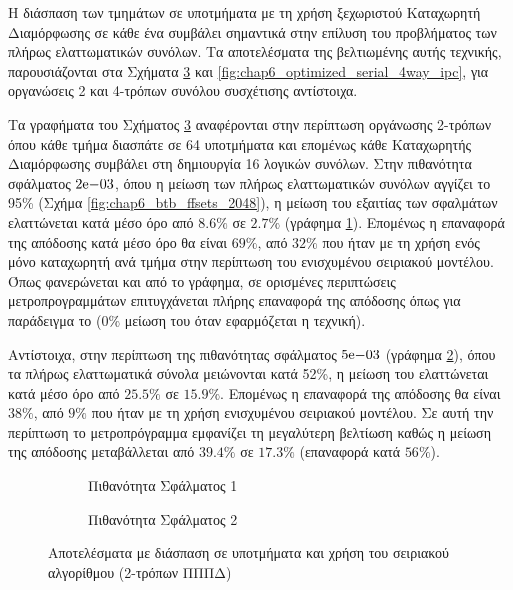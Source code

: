 Η διάσπαση των τμημάτων σε υποτμήματα με τη χρήση ξεχωριστού Καταχωρητή Διαμόρφωσης σε κάθε ένα συμβάλει σημαντικά στην επίλυση του προβλήματος των πλήρως ελαττωματικών συνόλων. Τα αποτελέσματα της βελτιωμένης αυτής τεχνικής, παρουσιάζονται στα Σχήματα \ref{fig:chap6_optimized_serial_2way_ipc} και \ref{fig:chap6_optimized_serial_4way_ipc}, για οργανώσεις 2 και 4-τρόπων συνόλου συσχέτισης αντίστοιχα.
\par
Τα γραφήματα του Σχήματος \ref{fig:chap6_optimized_serial_2way_ipc} αναφέρονται στην περίπτωση οργάνωσης 2-τρόπων όπου κάθε τμήμα διασπάτε σε 64 υποτμήματα και επομένως κάθε Καταχωρητής Διαμόρφωσης συμβάλει στη δημιουργία 16 λογικών συνόλων. Στην πιθανότητα σφάλματος $2\mathrm{e}{-03}$, όπου η μείωση των πλήρως ελαττωματικών συνόλων αγγίζει το 95\% (Σχήμα \ref{fig:chap6_btb_ffsets_2048}), η μείωση του \ipc εξαιτίας των σφαλμάτων ελαττώνεται κατά μέσο όρο από $8.6\%$ σε $2.7\%$ (γράφημα \ref{fig:chap6_optimized_serial_2way_pail1_ipc}). Επομένως η επαναφορά της απόδοσης κατά μέσο όρο θα είναι $69\%$, από $32\%$ που ήταν με τη χρήση ενός μόνο καταχωρητή ανά τμήμα στην περίπτωση του ενισχυμένου σειριακού μοντέλου. Όπως φανερώνεται και από το γράφημα, σε ορισμένες περιπτώσεις μετροπρογραμμάτων επιτυγχάνεται πλήρης επαναφορά της απόδοσης όπως για παράδειγμα το  ($0\%$ μείωση του \ipc όταν εφαρμόζεται η τεχνική).
\par
Αντίστοιχα, στην περίπτωση της πιθανότητας σφάλματος $5\mathrm{e}{-03}$ (γράφημα \ref{fig:chap6_optimized_serial_2way_pail2_ipc}), όπου τα πλήρως ελαττωματικά σύνολα μειώνονται κατά 52\%, η μείωση του \ipc ελαττώνεται κατά μέσο όρο από $25.5\%$ σε $15.9\%$. Επομένως η επαναφορά της απόδοσης θα είναι $38\%$, από $9\%$ που ήταν με τη χρήση ενισχυμένου σειριακού μοντέλου. Σε αυτή την περίπτωση το μετροπρόγραμμα  εμφανίζει τη μεγαλύτερη βελτίωση καθώς η μείωση της απόδοσης μεταβάλλεται από $39.4\%$ σε $17.3\%$ (επαναφορά κατά $56\%$).

\begin{figure}[!t]
    \centering
    \begin{subfigure}[t]{\textwidth}
        \centering
        \caption{Πιθανότητα Σφάλματος 1}
        \label{fig:chap6_optimized_serial_2way_pail1_ipc}
    \end{subfigure}
    
    \begin{subfigure}[t]{\textwidth}
        \centering
        \caption{Πιθανότητα Σφάλματος 2}
        \label{fig:chap6_optimized_serial_2way_pail2_ipc}
    \end{subfigure}
    
    \caption{Αποτελέσματα με διάσπαση σε υποτμήματα και χρήση του σειριακού αλγορίθμου (2-τρόπων ΠΠΠΔ)}
    \label{fig:chap6_optimized_serial_2way_ipc}
\end{figure}

